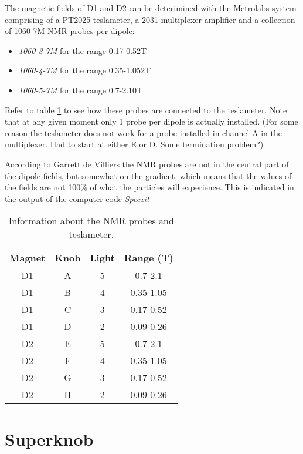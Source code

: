 \documentclass[11pt]{report}
\begin{document}
The magnetic fields of D1 and D2 can be deterimined with the Metrolabs system comprising
of a PT2025 teslameter, a 2031 multiplexer amplifier and a collection of 1060-7M NMR probes
per dipole:
\begin{itemize}
\item {\it 1060-3-7M} for the range 0.17-0.52T\\
\item {\it 1060-4-7M} for the range 0.35-1.052T\\
\item {\it 1060-5-7M} for the range 0.7-2.10T\\
\end{itemize}
Refer to table \ref{table:nmr} to see how these probes are connected to the teslameter.
Note that at any given moment only 1 probe per dipole is actually installed.
(For some reason the teslameter does not work for a probe installed in channel A in the multiplexer.
Had to start at either E or D. Some termination problem?)

According to Garrett de Villiers the NMR probes are not in the central part of the
dipole fields, but somewhat on the gradient, which means that the values of the fields are not 
100\% of what the particles will experience. 
This is indicated in the output of the computer code {\it Specxit}


\begin{table}[!ht]
\centering
\begin{tabular}{c|c|c|c}
\hline
Magnet & Knob & Light & Range (T)\\
\hline
D1 & A & 5 & 0.7-2.1 \\
D1 & B & 4 & 0.35-1.05 \\
D1 & C & 3 & 0.17-0.52 \\
D1 & D & 2 & 0.09-0.26 \\
\hline
D2 & E & 5 & 0.7-2.1 \\
D2 & F & 4 & 0.35-1.05 \\
D2 & G & 3 & 0.17-0.52 \\
D2 & H & 2 & 0.09-0.26 \\
\hline
\end{tabular}
\caption{Information about the NMR probes and teslameter.}
\label{table:nmr}
\end{table}


\section{Superknob}\label{sec:superknob}
\end{document}
